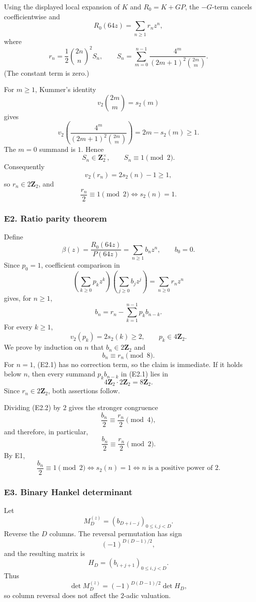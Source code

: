 \documentclass[
  10pt,
  letterpaper,
]{article}
\theoremstyle{definition}
\theoremstyle{remark}
\begin{document}
Using the displayed local expansion of \(K\) and \(R_0=K+GP\), the
\(-G\)-term cancels coefficientwise and \[
R_0(64z)=\sum_{n\ge1}r_nz^n,
\] where \[
r_n=\frac12\binom{2n}{n}^2S_n,
\qquad
S_n=\sum_{m=0}^{n-1}
\frac{4^m}{(2m+1)^2\binom{2m}{m}}.
\] (The constant term is zero.)

For \(m\ge1\), Kummer's identity \[
v_2\binom{2m}{m}=s_2(m)
\] gives \[
v_2\!\left(
\frac{4^m}{(2m+1)^2\binom{2m}{m}}
\right)
=2m-s_2(m)\ge1.
\] The \(m=0\) summand is \(1\). Hence \[
S_n\in\mathbf Z_2^\times,
\qquad
S_n\equiv1\pmod2.
\] Consequently \[
v_2(r_n)=2s_2(n)-1\ge1,
\] so \(r_n\in2\mathbf Z_2\), and \[
\frac{r_n}{2}\equiv1\pmod2
\iff s_2(n)=1.
\]

\subsubsection{E2. Ratio parity theorem}\label{e2.-ratio-parity-theorem}

Define \[
\beta(z)=\frac{R_0(64z)}{P(64z)}
=\sum_{n\ge1}b_nz^n,
\qquad b_0=0.
\] Since \(p_0=1\), coefficient comparison in \[
\left(\sum_{k\ge0}p_kz^k\right)
\left(\sum_{j\ge0}b_jz^j\right)
=\sum_{n\ge0}r_nz^n
\] gives, for \(n\ge1\), \[
b_n=r_n-\sum_{k=1}^{n-1}p_kb_{n-k}.
\tag{E2.1}
\] For every \(k\ge1\), \[
v_2(p_k)=2s_2(k)\ge2,
\qquad p_k\in4\mathbf Z_2.
\] We prove by induction on \(n\) that \(b_n\in2\mathbf Z_2\) and \[
b_n\equiv r_n\pmod8.
\tag{E2.2}
\] For \(n=1\), (E2.1) has no correction term, so the claim is
immediate. If it holds below \(n\), then every summand \(p_kb_{n-k}\) in
(E2.1) lies in \[
4\mathbf Z_2\cdot2\mathbf Z_2=8\mathbf Z_2.
\] Since \(r_n\in2\mathbf Z_2\), both assertions follow.

Dividing (E2.2) by \(2\) gives the stronger congruence \[
\frac{b_n}{2}\equiv\frac{r_n}{2}\pmod4,
\] and therefore, in particular, \[
\frac{b_n}{2}\equiv\frac{r_n}{2}\pmod2.
\] By E1, \[
\boxed{
\frac{b_n}{2}\equiv1\pmod2
\iff s_2(n)=1
\iff n\text{ is a positive power of }2.
}
\]

\subsubsection{E3. Binary Hankel
determinant}\label{e3.-binary-hankel-determinant}

Let \[
M_D^{(z)}=(b_{D+i-j})_{0\le i,j<D}.
\] Reverse the \(D\) columns. The reversal permutation has sign \[
(-1)^{D(D-1)/2},
\] and the resulting matrix is \[
H_D=(b_{i+j+1})_{0\le i,j<D}.
\] Thus \[
\det M_D^{(z)}=(-1)^{D(D-1)/2}\det H_D,
\] so column reversal does not affect the \(2\)-adic valuation.
\end{document}
